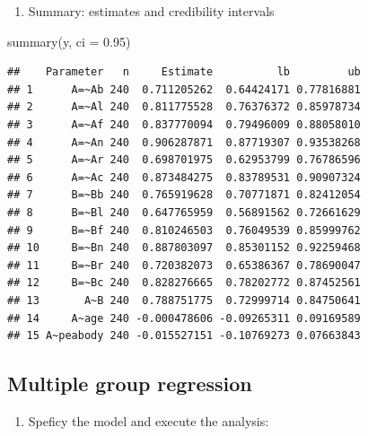 \documentclass[
]{book}
\newenvironment{Shaded}{\begin{snugshade}}{\end{snugshade}}
\newcommand{\AttributeTok}[1]{\textcolor[rgb]{0.77,0.63,0.00}{#1}}
\newcommand{\FloatTok}[1]{\textcolor[rgb]{0.00,0.00,0.81}{#1}}
\newcommand{\FunctionTok}[1]{\textcolor[rgb]{0.00,0.00,0.00}{#1}}
\newcommand{\NormalTok}[1]{#1}
\providecommand{\tightlist}{%
  \setlength{\itemsep}{0pt}\setlength{\parskip}{0pt}}
\begin{document}
\begin{enumerate}
\def\labelenumi{\arabic{enumi})}
\setcounter{enumi}{4}
\tightlist
\item
  Summary: estimates and credibility intervals
\end{enumerate}

\begin{Shaded}
\begin{Highlighting}[]
\FunctionTok{summary}\NormalTok{(y, }\AttributeTok{ci =} \FloatTok{0.95}\NormalTok{)}
\end{Highlighting}
\end{Shaded}

\begin{verbatim}
##    Parameter   n     Estimate          lb         ub
## 1      A=~Ab 240  0.711205262  0.64424171 0.77816881
## 2      A=~Al 240  0.811775528  0.76376372 0.85978734
## 3      A=~Af 240  0.837770094  0.79496009 0.88058010
## 4      A=~An 240  0.906287871  0.87719307 0.93538268
## 5      A=~Ar 240  0.698701975  0.62953799 0.76786596
## 6      A=~Ac 240  0.873484275  0.83789531 0.90907324
## 7      B=~Bb 240  0.765919628  0.70771871 0.82412054
## 8      B=~Bl 240  0.647765959  0.56891562 0.72661629
## 9      B=~Bf 240  0.810246503  0.76049539 0.85999762
## 10     B=~Bn 240  0.887803097  0.85301152 0.92259468
## 11     B=~Br 240  0.720382073  0.65386367 0.78690047
## 12     B=~Bc 240  0.828276665  0.78202772 0.87452561
## 13       A~B 240  0.788751775  0.72999714 0.84750641
## 14     A~age 240 -0.000478606 -0.09265311 0.09169589
## 15 A~peabody 240 -0.015527151 -0.10769273 0.07663843
\end{verbatim}

\hypertarget{multiple-group-regression}{%
\subsection{Multiple group regression}\label{multiple-group-regression}}

\begin{enumerate}
\def\labelenumi{\arabic{enumi})}
\tightlist
\item
  Speficy the model and execute the analysis:
\end{enumerate}
\end{document}
